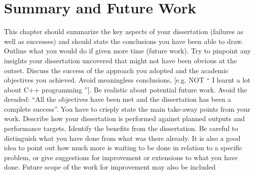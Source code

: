 \chapter{Summary and Future Work}
This chapter should summarize the key aspects of your dissertation (failures as well as successes) and should state the conclusions you have been able to draw.  Outline what you would do if given more time (future work).  Try to pinpoint any insights your dissertation uncovered that might not have been obvious at the outset.  Discuss the success of the approach you adopted and the academic objectives you achieved.  Avoid meaningless conclusions, [e.g. NOT `` I learnt a lot about C++ programming ''].  Be realistic about potential future work.  Avoid the dreaded: ``All the objectives have been met and the dissertation has been a complete success''.  You have to crisply state the main take-away points from your work.  Describe how your dissertation is performed against planned outputs and performance targets.  Identify the benefits from the dissertation.  Be careful to distinguish what you have done from what was there already.  It is also a good idea to point out how much more is waiting to be done in relation to a specific problem, or give suggestions for improvement or extensions to what you have done.  
Future scope of the work for improvement may also be included

